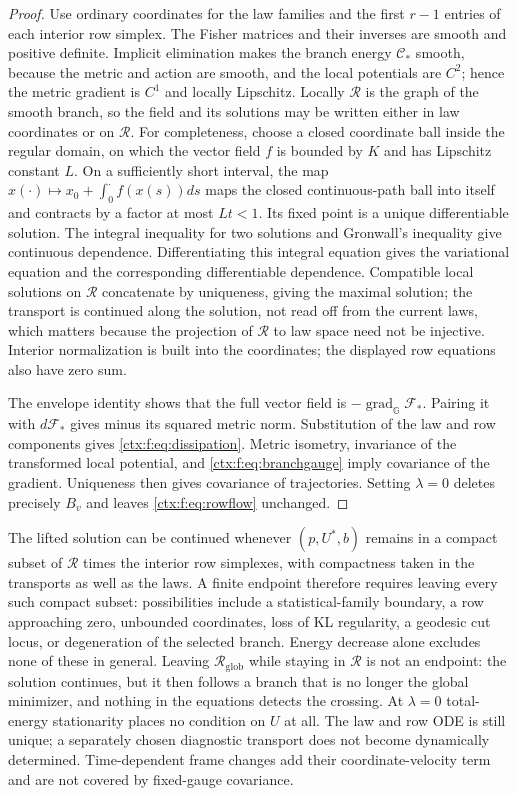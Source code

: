 \begin{proof}
Use ordinary coordinates for the law families and the first $r-1$ entries of each interior row simplex. The Fisher matrices and their inverses are smooth and positive definite. Implicit elimination makes the branch energy $\mathcal C_*$ smooth, because the metric and action are smooth, and the local potentials are $C^2$; hence the metric gradient is $C^1$ and locally Lipschitz. Locally $\mathcal R$ is the graph of the smooth branch, so the field and its solutions may be written either in law coordinates or on $\mathcal R$. For completeness, choose a closed coordinate ball inside the regular domain, on which the vector field $f$ is bounded by $K$ and has Lipschitz constant $L$. On a sufficiently short interval, the map
$x(\cdot)\mapsto x_0+\int_0^{\cdot}f(x(s))ds$
maps the closed continuous-path ball into itself and contracts by a factor at most $Lt<1$. Its fixed point is a unique differentiable solution. The integral inequality for two solutions and Gronwall's inequality give continuous dependence. Differentiating this integral equation gives the variational equation and the corresponding differentiable dependence. Compatible local solutions on $\mathcal R$ concatenate by uniqueness, giving the maximal solution; the transport is continued along the solution, not read off from the current laws, which matters because the projection of $\mathcal R$ to law space need not be injective. Interior normalization is built into the coordinates; the displayed row equations also have zero sum.

The envelope identity shows that the full vector field is $-\operatorname{grad}_{\mathbb G}\mathcal F_*$. Pairing it with $d\mathcal F_*$ gives minus its squared metric norm. Substitution of the law and row components gives \cref{ctx:f:eq:dissipation}. Metric isometry, invariance of the transformed local potential, and \cref{ctx:f:eq:branchgauge} imply covariance of the gradient. Uniqueness then gives covariance of trajectories. Setting $\lambda=0$ deletes precisely $B_v$ and leaves \cref{ctx:f:eq:rowflow} unchanged.
\end{proof}

The lifted solution can be continued whenever $(p,U^*,b)$ remains in a compact subset of $\mathcal R$ times the interior row simplexes, with compactness taken in the transports as well as the laws. A finite endpoint therefore requires leaving every such compact subset: possibilities include a statistical-family boundary, a row approaching zero, unbounded coordinates, loss of KL regularity, a geodesic cut locus, or degeneration of the selected branch. Energy decrease alone excludes none of these in general. Leaving $\mathcal R_{\mathrm{glob}}$ while staying in $\mathcal R$ is not an endpoint: the solution continues, but it then follows a branch that is no longer the global minimizer, and nothing in the equations detects the crossing. At $\lambda=0$ total-energy stationarity places no condition on $U$ at all. The law and row ODE is still unique; a separately chosen diagnostic transport does not become dynamically determined. Time-dependent frame changes add their coordinate-velocity term and are not covered by fixed-gauge covariance.

